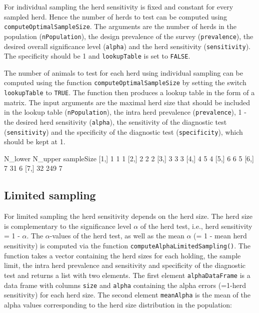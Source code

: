 \documentclass[nojss]{jss}
\begin{document}
For individual sampling the herd sensitivity is fixed and constant for every sampled herd. Hence the number of herds to test can be computed using \texttt{computeOptimalSampleSize}. The arguments are the number of herds in the population (\texttt{nPopulation}), the design prevalence of the survey (\texttt{prevalence}), the desired overall significance level (\texttt{alpha}) and the herd sensitivity (\texttt{sensitivity}). The specificity should be 1 and \texttt{lookupTable} is set to \texttt{FALSE}.

The number of animals to test for each herd using individual sampling can be computed using the function \texttt{computeOptimalSampleSize} by setting the switch \texttt{lookupTable} to \texttt{TRUE}. The function then produces a lookup table in the form of a matrix. The input arguments are the maximal herd size that should be included in the  lookup table (\texttt{nPopulation}), the intra herd prevalence (\texttt{prevalence}), 1 - the desired herd sensitivity (\texttt{alpha}), the sensitivity of the diagnostic test (\texttt{sensitivity}) and the specificity of the diagnostic test (\texttt{specificity}), which should be kept at 1.

\begin{Schunk}
\begin{Soutput}
     N_lower N_upper sampleSize
[1,]       1       1          1
[2,]       2       2          2
[3,]       3       3          3
[4,]       4       5          4
[5,]       6       6          5
[6,]       7      31          6
[7,]      32     249          7
\end{Soutput}
\end{Schunk}



\subsection{Limited sampling} \label{subsec:ltd-sampling-noclass}

For limited sampling the herd sensitivity depends on the herd size. The herd size is complementary to the significance level $\alpha$ of the herd test, i.e., herd sensitivity = 1 - $\alpha$. The $\alpha$-values of the herd test, as well as the mean $\alpha$ (= 1 - mean herd sensitivity) is computed via the function \texttt{computeAlphaLimitedSampling()}.  The function takes a vector containing the herd sizes for each holding, the sample limit, the intra herd prevalence and sensitivity and specificity of the diagnostic test and returns a list with two elements. The first element \texttt{alphaDataFrame} is a data frame with columns \texttt{size} and \texttt{alpha} containing the alpha errors (=1-herd sensitivity) for each herd size. The second element \texttt{meanAlpha} is the mean of the alpha values corresponding to the herd size distribution in the population:
\end{document}
